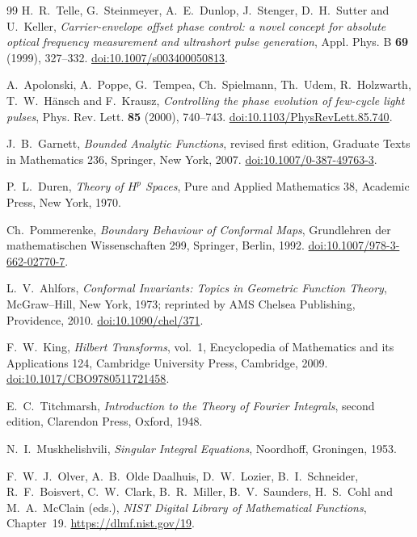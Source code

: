 \begin{thebibliography}{99}
H.~R.~Telle, G.~Steinmeyer, A.~E.~Dunlop, J.~Stenger, D.~H.~Sutter and U.~Keller,
\emph{Carrier-envelope offset phase control: a novel concept for absolute optical frequency measurement and ultrashort pulse generation},
Appl. Phys. B \textbf{69} (1999), 327--332.
\href{https://doi.org/10.1007/s003400050813}{doi:10.1007/s003400050813}.

A.~Apolonski, A.~Poppe, G.~Tempea, Ch.~Spielmann, Th.~Udem, R.~Holzwarth, T.~W.~H\"ansch and F.~Krausz,
\emph{Controlling the phase evolution of few-cycle light pulses},
Phys. Rev. Lett. \textbf{85} (2000), 740--743.
\href{https://doi.org/10.1103/PhysRevLett.85.740}{doi:10.1103/PhysRevLett.85.740}.

J.~B.~Garnett,
\emph{Bounded Analytic Functions}, revised first edition,
Graduate Texts in Mathematics 236, Springer, New York, 2007.
\href{https://doi.org/10.1007/0-387-49763-3}{doi:10.1007/0-387-49763-3}.

P.~L.~Duren,
\emph{Theory of $H^p$ Spaces},
Pure and Applied Mathematics 38, Academic Press, New York, 1970.

Ch.~Pommerenke,
\emph{Boundary Behaviour of Conformal Maps},
Grundlehren der mathematischen Wissenschaften 299, Springer, Berlin, 1992.
\href{https://doi.org/10.1007/978-3-662-02770-7}{doi:10.1007/978-3-662-02770-7}.

L.~V.~Ahlfors,
\emph{Conformal Invariants: Topics in Geometric Function Theory},
McGraw--Hill, New York, 1973; reprinted by AMS Chelsea Publishing, Providence, 2010.
\href{https://doi.org/10.1090/chel/371}{doi:10.1090/chel/371}.

F.~W.~King,
\emph{Hilbert Transforms}, vol.~1,
Encyclopedia of Mathematics and its Applications 124, Cambridge University Press, Cambridge, 2009.
\href{https://doi.org/10.1017/CBO9780511721458}{doi:10.1017/CBO9780511721458}.

E.~C.~Titchmarsh,
\emph{Introduction to the Theory of Fourier Integrals}, second edition,
Clarendon Press, Oxford, 1948.

N.~I.~Muskhelishvili,
\emph{Singular Integral Equations},
Noordhoff, Groningen, 1953.

F.~W.~J.~Olver, A.~B.~Olde Daalhuis, D.~W.~Lozier, B.~I.~Schneider, R.~F.~Boisvert, C.~W.~Clark, B.~R.~Miller, B.~V.~Saunders, H.~S.~Cohl and M.~A.~McClain (eds.),
\emph{NIST Digital Library of Mathematical Functions}, Chapter~19.
\url{https://dlmf.nist.gov/19}.



\end{thebibliography}
